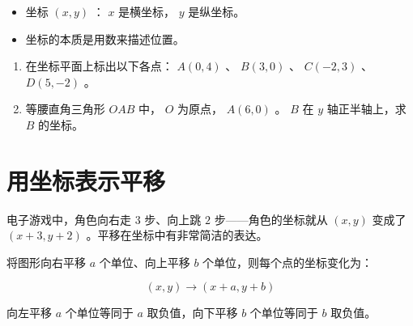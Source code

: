 \begin{keytakeaway}


\begin{itemize}
  \item 坐标 $(x, y)$ ： $x$ 是横坐标， $y$ 是纵坐标。
  \item 坐标的本质是用数来描述位置。
\end{itemize}


\end{keytakeaway}

\begin{practice}


\begin{enumerate}
  \item 在坐标平面上标出以下各点： $A(0, 4)$ 、 $B(3, 0)$ 、 $C(-2, 3)$ 、 $D(5, -2)$ 。
  \item 等腰直角三角形 $OAB$ 中， $O$ 为原点， $A(6, 0)$ 。 $B$ 在 $y$ 轴正半轴上，求 $B$ 的坐标。
\end{enumerate}


\end{practice}



\section*{用坐标表示平移}


\begin{explore}


电子游戏中，角色向右走 $3$ 步、向上跳 $2$ 步——角色的坐标就从 $(x, y)$ 变成了 $(x+3, y+2)$ 。平移在坐标中有非常简洁的表达。

\end{explore}

\begin{understand}


将图形向右平移 $a$ 个单位、向上平移 $b$ 个单位，则每个点的坐标变化为：

\[
(x, y) \to (x + a, y + b)
\]


向左平移 $a$ 个单位等同于 $a$ 取负值，向下平移 $b$ 个单位等同于 $b$ 取负值。

\end{understand}

